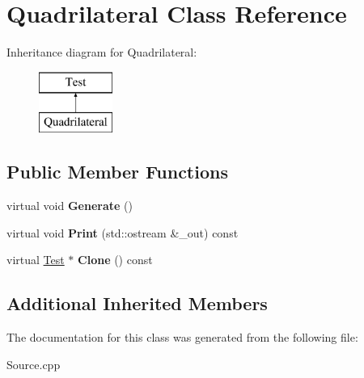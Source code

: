 \hypertarget{class_quadrilateral}{}\section{Quadrilateral Class Reference}
\label{class_quadrilateral}
Inheritance diagram for Quadrilateral\+:\begin{figure}[H]
\begin{center}
\leavevmode
\includegraphics[height=2.000000cm]{class_quadrilateral}
\end{center}
\end{figure}
\subsection*{Public Member Functions}
\begin{DoxyCompactItemize}
\item 
\mbox{\label{class_quadrilateral_aaa2c98ed785ae526a760e411808d19d4}} 
virtual void {\bfseries Generate} ()
\item 
\mbox{\label{class_quadrilateral_a8cd7b99d0f1790e97bc90aecba0f52c1}} 
virtual void {\bfseries Print} (std\+::ostream \&\+\_\+out) const
\item 
\mbox{\label{class_quadrilateral_aa68850ecd4e782c1fb452ae954858b5c}} 
virtual \hyperlink{class_test}{Test} $\ast$ {\bfseries Clone} () const
\end{DoxyCompactItemize}
\subsection*{Additional Inherited Members}


The documentation for this class was generated from the following file\+:\begin{DoxyCompactItemize}
\item 
Source.\+cpp\end{DoxyCompactItemize}
